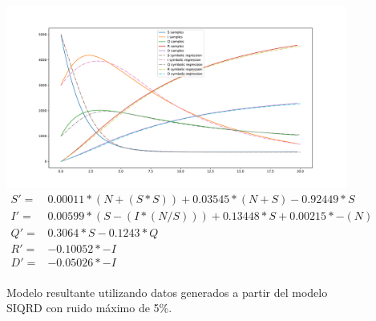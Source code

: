 \begin{figure}[h]
    \centering
    \includegraphics[width=\textwidth]{"figures/final_plot_SIQRD_0.05.pdf"}
    \begin{align*}
        S' = & 0.00011 * (N + (S * S)) + 0.03545 * (N + S) -0.92449 * S     \\
        I' = & 0.00599 * (S - (I * (N / S))) + 0.13448 * S + 0.00215 * -(N) \\
        Q' = & 0.3064 * S -0.1243 * Q                                       \\
        R' = & -0.10052 * -I                                                \\
        D' = & -0.05026 * -I                                                \\
    \end{align*}
    \caption{Modelo resultante utilizando datos generados a partir del modelo SIQRD con ruido máximo de 5\%.}
    \label{fig:final_plot_SIQRD_0.05}
\end{figure}

